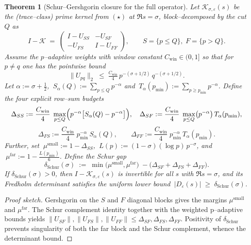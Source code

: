 \documentclass[11pt]{article}
\newtheorem{theorem}{Theorem}
\theoremstyle{definition}
\theoremstyle{remark}
\begin{document}
\begin{theorem}[Schur--Gershgorin closure for the full operator]\label{thm:schur-closure}
Let $\mathcal K_{\sigma,\varepsilon}(s)$ be the (trace--class) prime kernel from $(\star)$ at $\Re s=\sigma$, block--decomposed by the cut $Q$ as
\[
 I-\mathcal K
 \;=\;
 \begin{pmatrix}
   I-U_{SS} & -U_{SF} \\
   -U_{FS}  & I-U_{FF}
 \end{pmatrix},
\qquad
 S=\{p\le Q\},\;F=\{p>Q\}.
\]
Assume the $p$--adaptive weights with window constant $C_{\mathrm{win}}\in(0,1]$ so that for $p\neq q$ one has the pointwise bound
\[
  \|U_{pq}\|_2\;\le\;\tfrac{C_{\mathrm{win}}}{4}\,p^{-(\sigma+1/2)}\,q^{-(\sigma+1/2)}.
\]
Let $\alpha:=\sigma+\tfrac12$, $\ S_{\alpha}(Q):=\sum_{p\le Q} p^{-\alpha}$ and $\ T_{\alpha}(p_{\min}):=\sum_{p\ge p_{\min}} p^{-\alpha}$. Define the four explicit row--sum budgets
\[
\Delta_{SS}:=\frac{C_{\mathrm{win}}}{4}\;\max_{p\le Q}
          \Bigl(p^{-\alpha}\bigl[S_{\alpha}(Q)-p^{-\alpha}\bigr]\Bigr),\quad
\Delta_{SF}:=\frac{C_{\mathrm{win}}}{4}\;\max_{p\le Q}\bigl(p^{-\alpha}\bigr)\,T_{\alpha}(p_{\min}),
\]
\[
\Delta_{FS}:=\frac{C_{\mathrm{win}}}{4}\;p_{\min}^{-\alpha}\,S_{\alpha}(Q),\qquad
\Delta_{FF}:=\frac{C_{\mathrm{win}}}{4}\;p_{\min}^{-\alpha}\,T_{\alpha}(p_{\min}).
\]
Further, set $\ \mu^{\mathrm{small}}:=1-\Delta_{SS}$, $\ L(p):=(1-\sigma)(\log p)\,p^{-\sigma}$, and $\ \mu^{\mathrm{far}}:=1-\tfrac{L(p_{\min})}{6}$. Define the Schur gap
\[
  \delta_{\mathrm{Schur}}(\sigma)
   \;:=\;
   \min\bigl(\mu^{\mathrm{small}},\mu^{\mathrm{far}}\bigr)
   \;-
   \bigl(\Delta_{SF}+\Delta_{FS}+\Delta_{FF}\bigr).
\]
If $\delta_{\mathrm{Schur}}(\sigma)>0$, then $I-\mathcal K_{\sigma,\varepsilon}(s)$ is invertible for all $s$ with $\Re s=\sigma$, and its Fredholm determinant satisfies the uniform lower bound $\ |D_{\varepsilon}(s)| \;\ge\; \delta_{\mathrm{Schur}}(\sigma)$.
\end{theorem}

\begin{proof}[Proof sketch]
Gershgorin on the $S$ and $F$ diagonal blocks gives the margins $\mu^{\mathrm{small}}$ and $\mu^{\mathrm{far}}$. The Schur complement identity together with the weighted p--adaptive bounds yields $\|U_{SF}\|,\|U_{FS}\|,\|U_{FF}\|\le\Delta_{SF},\Delta_{FS},\Delta_{FF}$. Positivity of $\delta_{\mathrm{Schur}}$ prevents singularity of both the far block and the Schur complement, whence the determinant bound.
\end{proof}
\end{document}
